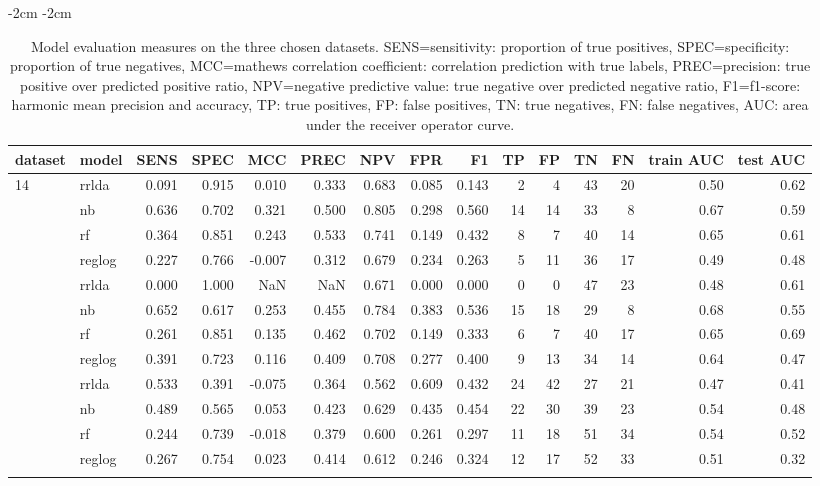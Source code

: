 \begin{table}[htpb]
\addtolength{\leftskip} {-2cm} %
\addtolength{\rightskip} {-2cm} %
\begin{tabular}{llrrrrrrrrrrrrr}
\toprule{}
dataset &model & SENS & SPEC & MCC & PREC & NPV & FPR & F1 & TP & FP & TN & FN & train AUC & test AUC\\
\midrule{}
14    & rrlda & 0.091 & 0.915 & 0.010 & 0.333 & 0.683 & 0.085 & 0.143 & 2 & 4 & 43 & 20 & 0.50 & 0.62\\
    & nb & 0.636 & 0.702 & 0.321 & 0.500 & 0.805 & 0.298 & 0.560 & 14 & 14 & 33 & 8 & 0.67 & 0.59\\
    & rf & 0.364 & 0.851 & 0.243 & 0.533 & 0.741 & 0.149 & 0.432 & 8 & 7 & 40 & 14 & 0.65 & 0.61\\
    & reglog & 0.227 & 0.766 & -0.007 & 0.312 & 0.679 & 0.234 & 0.263 & 5 & 11 & 36 & 17 & 0.49 & 0.48\\
\addlinespace
16    & rrlda & 0.000 & 1.000 & NaN & NaN & 0.671 & 0.000 & 0.000 & 0 & 0 & 47 & 23 & 0.48 & 0.61\\
    & nb & 0.652 & 0.617 & 0.253 & 0.455 & 0.784 & 0.383 & 0.536 & 15 & 18 & 29 & 8 & 0.68 & 0.55\\
    & rf & 0.261 & 0.851 & 0.135 & 0.462 & 0.702 & 0.149 & 0.333 & 6 & 7 & 40 & 17 & 0.65 & 0.69\\
    & reglog & 0.391 & 0.723 & 0.116 & 0.409 & 0.708 & 0.277 & 0.400 & 9 & 13 & 34 & 14 & 0.64 & 0.47\\
\addlinespace
19    & rrlda & 0.533 & 0.391 & -0.075 & 0.364 & 0.562 & 0.609 & 0.432 & 24 & 42 & 27 & 21 & 0.47 & 0.41\\
    & nb & 0.489 & 0.565 & 0.053 & 0.423 & 0.629 & 0.435 & 0.454 & 22 & 30 & 39 & 23 & 0.54 & 0.48\\
    & rf & 0.244 & 0.739 & -0.018 & 0.379 & 0.600 & 0.261 & 0.297 & 11 & 18 & 51 & 34 & 0.54 & 0.52\\
    & reglog & 0.267 & 0.754 & 0.023 & 0.414 & 0.612 & 0.246 & 0.324 & 12 & 17 & 52 & 33 & 0.51 & 0.32\\
\bottomrule{}
\end{tabular}
\caption{
    Model evaluation measures on the three chosen datasets.
    SENS=sensitivity: proportion of true positives,
    SPEC=specificity: proportion of true negatives,
    MCC=mathews correlation coefficient:
    correlation prediction with true labels,
    PREC=precision: true positive over predicted positive ratio,
    NPV=negative predictive value: true negative over predicted negative ratio,
    F1=f1-score: harmonic mean precision and accuracy,
    TP: true positives,
    FP: false positives,
    TN: true negatives,
    FN: false negatives,
    AUC: area under the receiver operator curve.}\label{tbl:modelEval}
\end{table}

